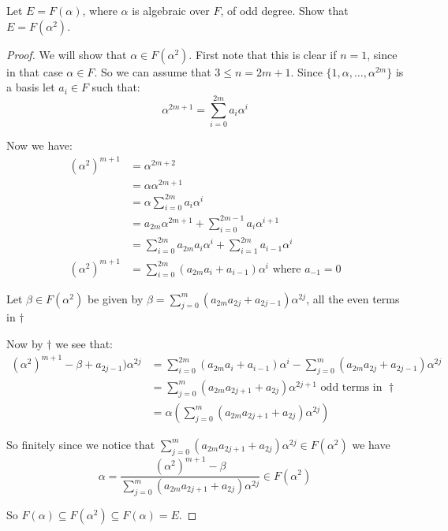 \begin{exercise}
Let $E=F(\alpha)$, where $\alpha$ is algebraic over $F$, of odd degree. Show that $E=F(\alpha^2)$.
\begin{proof}
We will show that $\alpha\in F(\alpha^2)$. First note that this is clear if $n=1$, since in that case $\alpha\in F$. So we can assume that $3\leq n = 2m+1$. Since $\{1,\alpha,\dots, \alpha^{2m}\}$ is a basis let $a_i\in F$ such that:\begin{equation}
    \alpha^{2m+1} = \sum_{i=0}^{2m}a_i\alpha^i  
\end{equation}   

Now we have:\begin{align*}
    {(\alpha^2)}^{m+1} &= \alpha^{2m+2}\\
                       &= \alpha\alpha^{2m+1}\\
                       &= \alpha\sum_{i=0}^{2m}a_i\alpha^i\\
                       &= a_{2m}\alpha^{2m+1}+\sum_{i=0}^{2m-1}a_i\alpha^{i+1}\\
                       &= \sum_{i=0}^{2m}a_{2m}a_i\alpha^i + \sum_{i=1}^{2m}a_{i-1}\alpha^i\\
    {(\alpha^2)}^{m+1} &= \sum_{i=0}^{2m}(a_{2m}a_i + a_{i-1})\alpha^i \text{ where }a_{-1} = 0 \tag{$\dagger$}
\end{align*}

Let $\beta\in F(\alpha^2)$ be given by $\beta = \sum_{j=0}^{m}(a_{2m}a_{2j} + a_{2j-1})\alpha^{2j}$, all the even terms in $\dagger$

Now by $\dagger$ we see that:\begin{align*}
    {(\alpha^2)}^{m+1} - \beta + a_{2j-1})\alpha^{2j} &= \sum_{i=0}^{2m}(a_{2m}a_i + a_{i-1})\alpha^i - \sum_{j=0}^{m}(a_{2m}a_{2j} + a_{2j-1})\alpha^{2j}\\
    &= \sum_{j=0}^{m}(a_{2m}a_{2j+1} + a_{2j})\alpha^{2j+1} \text{ odd terms in }\dagger\\
    &= \alpha(\sum_{j=0}^{m}(a_{2m}a_{2j+1} + a_{2j})\alpha^{2j})
\end{align*}


So finitely since we notice that $\sum_{j=0}^{m}(a_{2m}a_{2j+1} + a_{2j})\alpha^{2j} \in F(\alpha^2)$ we have \[\alpha = \frac{{(\alpha^2)}^{m+1} - \beta}{\sum_{j=0}^{m}(a_{2m}a_{2j+1} + a_{2j})\alpha^{2j}}\in F(\alpha^2)\]

So $F(\alpha)\subseteq F(\alpha^2)\subseteq F(\alpha) = E$.

\end{proof}
\end{exercise}


